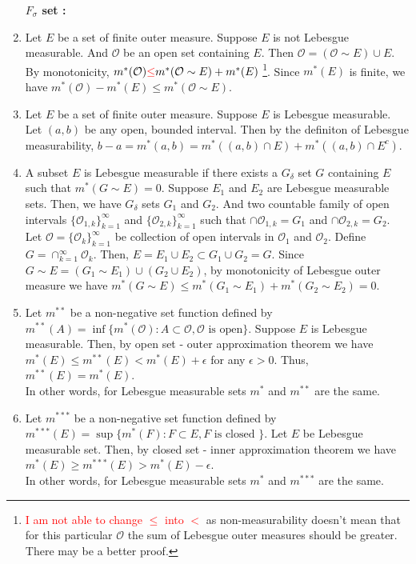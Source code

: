 \begin{enumerate}
	\textbf{$F_\sigma$ set : }
\item
 	Let $E$ be a set of finite outer measure.
	Suppose $E$ is not Lebesgue measurable.
	And $\mathcal{O}$ be an open set containing $E$.
	Then $\mathcal{O} = (\mathcal{O} \sim E) \cup E$.
		By monotonicity, $m^\ast(\mathcal{O}) \textcolor{red}{ \le } m^\ast(\mathcal{O} \sim E) + m^\ast(E)$
		\dag\footnote{\textcolor{red}{I am not able to change $\le$ into $<$} as non-measurability doesn't mean that for this particular $\mathcal{O}$ the sum of Lebesgue outer measures should be greater. There may be a better proof.}.
	Since $m^\ast(E)$ is finite, we have $m^\ast(\mathcal{O}) - m^\ast(E) \le m^\ast(\mathcal{O} \sim E)$.
\item  Let $E$ be a set of finite outer measure.
	Suppose $E$ is Lebesgue measurable.
	Let $(a,b)$ be any open, bounded interval.
	Then by the definiton of Lebesgue measurability, $b-a = m^\ast(a,b) = m^\ast((a,b) \cap E) + m^\ast((a,b) \cap E^c)$.
\item  
 	A subset $E$ is Lebesgue measurable if there exists a $G_\delta$ set $G$ containing $E$ such that $m^\ast(G \sim E) = 0$.
	Suppose $E_1$ and $E_2$ are Lebesgue measurable sets.	
	Then, we have $G_\delta$ sets $G_1$ and $G_2$.
	And two countable family of open intervals $\{\mathcal{O}_{1,k}\}_{k=1}^\infty$ and $\{ \mathcal{O}_{2,k}\}_{k=1}^\infty$ such that $\cap \mathcal{O}_{1,k} = G_1$ and $\cap \mathcal{O}_{2,k} = G_2$.
	Let $\mathcal{O} = \{ \mathcal{O}_k \}_{k=1}^\infty$ be collection of open intervals in $\mathcal{O}_1$ and $\mathcal{O}_2$.
	Define $G = \cap_{k=1}^\infty \mathcal{O}_k$.
	Then, $E = E_1 \cup E_2 \subset G_1 \cup G_2 = G$.
	Since $G \sim E = (G_1 \sim E_1) \cup (G_2 \cup E_2)$, by monotonicity of Lebesgue outer measure we have $m^\ast(G \sim E) \le m^\ast(G_1 \sim E_1) + m^\ast(G_2 \sim E_2) = 0$.
\item
	Let $m^{\ast\ast}$ be a non-negative set function defined by $m^{\ast\ast}(A) = \inf \{ m^\ast(\mathcal{O}) : A \subset \mathcal{O}, \mathcal{O} \text{ is open} \}$.
	Suppose $E$ is Lebesgue measurable.
	Then, by open set - outer approximation theorem
	we have $m^\ast(E) \le m^{\ast\ast}(E) < m^\ast(E) + \epsilon$ for any $\epsilon > 0$.
	Thus, $m^{\ast\ast}(E) = m^\ast(E)$. \\

	In other words, for Lebesgue measurable sets $m^\ast$ and $m^{\ast\ast}$ are the same.
\item  
	Let $m^{\ast\ast\ast}$ be a non-negative set function defined by $m^{\ast\ast\ast}(E) = \sup \{ m^\ast(F) : F \subset E, F \text{ is closed } \}$.
	Let $E$ be Lebesgue measurable set.
	Then, by closed set - inner approximation theorem
	we have $m^\ast(E) \ge m^{\ast\ast\ast}(E) > m^\ast(E)-\epsilon$.\\

	In other words, for Lebesgue measurable sets $m^\ast$ and $m^{\ast\ast\ast}$ are the same.
\end{enumerate}
